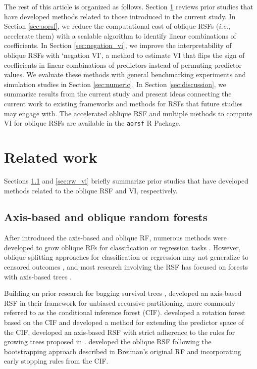 \documentclass{article}\usepackage[]{graphicx}\usepackage[]{xcolor}
\newcommand{\ie}{\textit{i.e.}}
\newcommand{\eg}{\textit{e.g.}}
\newcommand{\secref}[1]{Section \ref{#1}}
\begin{document}
The rest of this article is organized as follows. \secref{sec:background} reviews prior studies that have developed methods related to those introduced in the current study. In \secref{sec:aorsf}, we reduce the computational cost of oblique RSFs (\ie, accelerate them) with a scalable algorithm to identify linear combinations of coefficients. In \secref{sec:negation_vi}, we improve the interpretability of oblique RSFs with `negation VI', a method to estimate VI that flips the sign of coefficients in linear combinations of predictors instead of permuting predictor values. We evaluate these methods with general benchmarking experiments and simulation studies in \secref{sec:numeric}. In \secref{sec:discussion}, we summarize results from the current study and present ideas connecting the current work to existing frameworks and methods for RSFs that future studies may engage with. The accelerated oblique RSF and multiple methods to compute VI for oblique RSFs are available in the \texttt{aorsf} R Package.


\section{Related work} \label{sec:background}

Sections \ref{sec:rw_forests} and \ref{sec:rw_vi} briefly summarize prior studies that have developed methods related to the oblique RSF and VI, respectively.

\subsection{Axis-based and oblique random forests} \label{sec:rw_forests}

After \citet{breiman2001random} introduced the axis-based and oblique RF, numerous methods were developed to grow oblique RFs for classification or regression tasks \citep{menze2011oblique, zhang2014oblique, rainforth2015canonical, zhu2015reinforcement, poona2016investigating, qiu2017oblique, tomita2020sparse, katuwal2020heterogeneous}. However, oblique splitting approaches for classification or regression may not generalize to censored outcomes \citep[\eg, see][Section~4.5.1]{zhu2013tree}, and most research involving the RSF has focused on forests with axis-based trees \citep{wang2017selective}.

Building on prior research for bagging survival trees \citep{hothorn2004bagging}, \citet{hothorn2006unbiased} developed an axis-based RSF in their framework for unbiased recursive partitioning, more commonly referred to as the conditional inference forest (CIF). \citet{zhou2016random} developed a rotation forest based on the CIF and \citet{wang2017random} developed a method for extending the predictor space of the CIF. \citet{ishwaran2008random} developed an axis-based RSF with strict adherence to the rules for growing trees proposed in \citet{breiman2001random}.  \citet{jaeger2019oblique} developed the oblique RSF following the bootstrapping approach described in Breiman's original RF and incorporating early stopping rules from the CIF.
\end{document}

